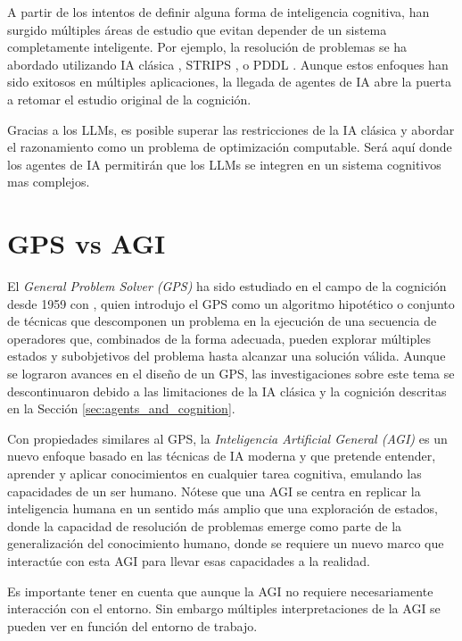 A partir de los intentos de definir alguna forma de inteligencia cognitiva, han
surgido múltiples áreas de estudio que evitan depender de un sistema
completamente inteligente. Por ejemplo, la resolución de problemas se ha
abordado utilizando IA clásica \citep{russell2016artificial}, STRIPS
\citep{fikes1971strips}, o PDDL \citep{aeronautiques1998pddl}. Aunque estos
enfoques han sido exitosos en múltiples aplicaciones, la llegada de agentes de
IA abre la puerta a retomar el estudio original de la cognición.

Gracias a los LLMs, es posible superar las restricciones de la IA clásica y
abordar el razonamiento como un problema de optimización computable. Será aquí
donde los agentes de IA permitirán que los LLMs se integren en un sistema
cognitivos mas complejos. 

\section{GPS vs AGI}

El \emph{General Problem Solver (GPS)} ha sido estudiado en el campo de la
cognición desde 1959 con \citet{newell1959report}, quien introdujo el GPS como
un algoritmo hipotético o conjunto de técnicas que descomponen un problema en la
ejecución de una secuencia de operadores que, combinados de la forma adecuada,
pueden explorar múltiples estados y subobjetivos del problema hasta alcanzar una
solución válida. Aunque se lograron avances en el diseño de un GPS, las
investigaciones sobre este tema se descontinuaron debido a las limitaciones de
la IA clásica y la cognición descritas en la Sección
\ref{sec:agents_and_cognition}.

Con propiedades similares al GPS, la \emph{Inteligencia Artificial General
(AGI)} es un nuevo enfoque basado en las técnicas de IA moderna y que pretende
entender, aprender y aplicar conocimientos en cualquier tarea cognitiva,
emulando las capacidades de un ser humano. Nótese que una AGI se centra en
replicar la inteligencia humana en un sentido más amplio que una exploración de
estados, donde la capacidad de resolución de problemas emerge como parte de la
generalización del conocimiento humano, donde se requiere un nuevo marco que
interactúe con esta AGI para llevar esas capacidades a la realidad.

Es importante tener en cuenta que aunque la AGI no requiere necesariamente
interacción con el entorno. Sin embargo múltiples interpretaciones de la
AGI se pueden ver en función del entorno de trabajo.

